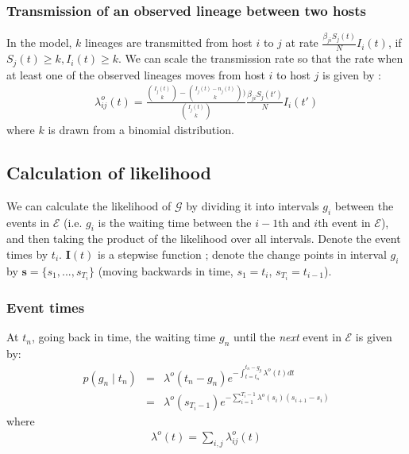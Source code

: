 \documentclass[a4paper,18pt]{report}
\begin{document}
\subsubsection{Transmission of an observed lineage between two hosts}
In the model, $k$ lineages are transmitted from host $i$ to $j$ at rate $\frac{\beta_{ji}S_j(t)}{N}I_i(t)$, if $S_j(t) \geq k, I_i(t) \geq k$. We can scale the transmission rate so that the rate when at least one of the observed lineages moves from host $i$ to host $j$ is given by : 
\begin{eqnarray}
\lambda_{ij}^o(t) =  \frac{{I_j(t) \choose k} - {I_j(t)  - n_j(t) \choose k}  )}{{I_j(t) \choose k}}  \frac{\beta_{ji} S_j(t')}{N}I_i(t')
\end{eqnarray}
where $k$ is drawn from a binomial distribution.
\subsection{Calculation of likelihood}
We can calculate the likelihood of $\mathcal{G}$ by dividing it into intervals $g_i$ between the events in $\mathcal{E} $ (i.e. $g_i$ is the waiting time between the $i-1$th and $i$th event in $\mathcal{E}$), and then taking the product of the likelihood over all intervals. Denote the event times by $t_i$. $\mathbf{I}(t)$ is a stepwise function ; denote the change points in interval $g_i$ by  $\mathbf{s} = \{s_1, ... , s_{T_i}\}$ (moving backwards in time, $s_1=t_i$, $s_{T_i}=t_{i-1}$).
\subsubsection{Event times}
At $t_n$, going back in time, the waiting time $g_n$ until the {\it next} event in $\mathcal{E}$ is given by:
\begin{eqnarray}
p(g_n \mid t_n) &=& \lambda^o(t_n - g_n) e^{-\int_{t=t_n}^{t_n - g_g} \lambda^o(t)dt} \nonumber\\
&=& \lambda^o(s_{T_i-1}) e^{-\sum_{i=1}^{T_i-1} \lambda^o(s_i)(s_{i+1} - s_i)}
\end{eqnarray}
where 
\begin{eqnarray}
\lambda^o(t) = \sum_{i,j}\lambda_{ij}^o(t)
\end{eqnarray}
\end{document}
